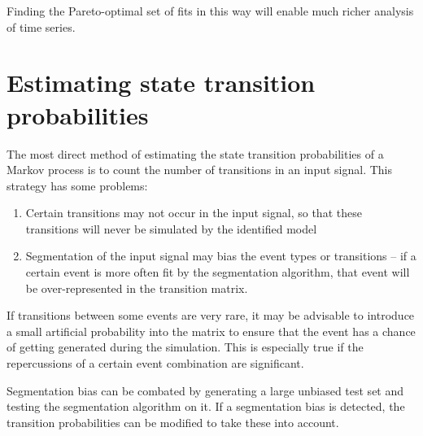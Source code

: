 Finding the Pareto-optimal set of fits in this way will enable much
richer analysis of time series.

\section{Estimating state transition probabilities}
The most direct method of estimating the state transition
probabilities of a Markov process is to count the number of
transitions in an input signal.  This strategy has some problems:
\begin{enumerate}
\item Certain transitions may not occur in the input signal, so that
  these transitions will never be simulated by the identified model
\item Segmentation of the input signal may bias the event types or
  transitions -- if a certain event is more often fit by the
  segmentation algorithm, that event will be over-represented in the
  transition matrix.
\end{enumerate}

If transitions between some events are very rare, it may be advisable
to introduce a small artificial probability into the matrix to ensure
that the event has a chance of  getting generated during the
simulation.  This is especially true if the repercussions of a certain
event combination are significant.  

Segmentation bias can be combated by generating a large unbiased test
set and testing the segmentation algorithm on it.  If a segmentation
bias is detected, the transition probabilities can be modified to take
these into account.



